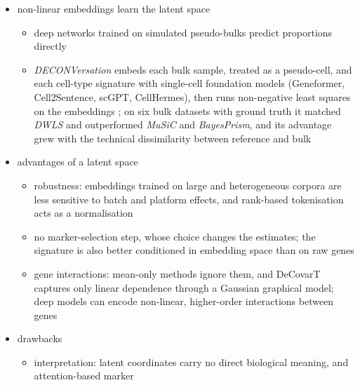 \documentclass[pdflatex, sn-nature]{sn-jnl}
\theoremstyle{thmstyleone}%
\theoremstyle{thmstyletwo}%
\theoremstyle{thmstylethree}%
\newcommand{\vignette}[2]{\href{https://bastienchassagnol.github.io/DeCovarT/articles/#1}{#2}}
\begin{document}
\begin{itemize}
\begin{itemize}
          (Friguet, Kloareg and Causeur, 2009); %
          \emph{HADACA3} uses it to simulate correlated noise on the bulk from the residuals of mixtures of
          known composition \cite{barbotPromisesLimitsMultimodal2026}; as a generator of \(\boldsymbol{\Sigma}_{j}\), its precision is a
          diagonal minus a rank-\(q\) term, dense, so it tests the sparse precision of DeCovarT outside its family
          (\vignette{S5-misspecification.html}{misspecification vignette})
  \end{itemize}
  \item non-linear embeddings learn the latent space
  \begin{itemize}
    \item deep networks trained on simulated pseudo-bulks predict proportions directly
          \cite{mendenDeepLearningBased2020}
    \item \emph{DECONVersation} embeds each bulk sample, treated as a pseudo-cell, and each cell-type signature
          with single-cell foundation models (Geneformer, Cell2Sentence, scGPT, CellHermes), then runs
          non-negative least squares on the embeddings \cite{okuDECONVersationSingleCell2026}; on six bulk datasets with ground
          truth it matched \emph{DWLS} and outperformed \emph{MuSiC} and \emph{BayesPrism}, and its advantage grew
          with the technical dissimilarity between reference and bulk
  \end{itemize}
  \item advantages of a latent space
  \begin{itemize}
    \item robustness: embeddings trained on large and heterogeneous corpora are less sensitive to batch and
          platform effects, and rank-based tokenisation acts as a normalisation
    \item no marker-selection step, whose choice changes the estimates; the signature is also better
          conditioned in embedding space than on raw genes
    \item gene interactions: mean-only methods ignore them, and DeCovarT captures only linear dependence
          through a Gaussian graphical model; deep models can encode non-linear, higher-order interactions
          between genes
  \end{itemize}
  \item drawbacks
  \begin{itemize}
    \item interpretation: latent coordinates carry no direct biological meaning, and attention-based marker

\end{itemize}
\end{itemize}
\end{document}
